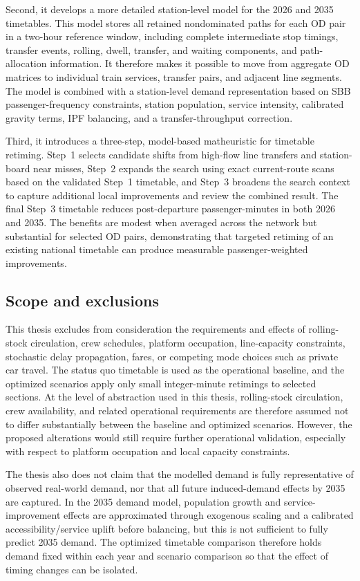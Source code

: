 \documentclass[preprint,12pt]{elsarticle}
\begin{document}
Second, it develops a more detailed station-level model for the 2026 and 2035 timetables. This model stores all retained nondominated paths for each OD pair in a two-hour reference window, including complete intermediate stop timings, transfer events, rolling, dwell, transfer, and waiting components, and path-allocation information. It therefore makes it possible to move from aggregate OD matrices to individual train services, transfer pairs, and adjacent line segments. The model is combined with a station-level demand representation based on SBB passenger-frequency constraints, station population, service intensity, calibrated gravity terms, IPF balancing, and a transfer-throughput correction.

Third, it introduces a three-step, model-based matheuristic for timetable retiming. Step~1 selects candidate shifts from high-flow line transfers and station-board near misses, Step~2 expands the search using exact current-route scans based on the validated Step~1 timetable, and Step~3 broadens the search context to capture additional local improvements and review the combined result. The final Step~3 timetable reduces post-departure passenger-minutes in both 2026 and 2035. The benefits are modest when averaged across the network but substantial for selected OD pairs, demonstrating that targeted retiming of an existing national timetable can produce measurable passenger-weighted improvements.

\subsection{Scope and exclusions}\label{sec:scope}

This thesis excludes from consideration the requirements and effects of rolling-stock circulation, crew schedules, platform occupation, line-capacity constraints, stochastic delay propagation, fares, or competing mode choices such as private car travel. The status quo timetable is used as the operational baseline, and the optimized scenarios apply only small integer-minute retimings to selected sections. At the level of abstraction used in this thesis, rolling-stock circulation, crew availability, and related operational requirements are therefore assumed not to differ substantially between the baseline and optimized scenarios. However, the proposed alterations would still require further operational validation, especially with respect to platform occupation and local capacity constraints.

The thesis also does not claim that the modelled demand is fully representative of observed real-world demand, nor that all future induced-demand effects by 2035 are captured. In the 2035 demand model, population growth and service-improvement effects are approximated through exogenous scaling and a calibrated accessibility/service uplift before balancing, but this is not sufficient to fully predict 2035 demand. The optimized timetable comparison therefore holds demand fixed within each year and scenario comparison so that the effect of timing changes can be isolated.
\end{document}
